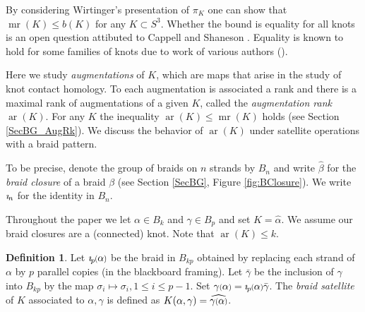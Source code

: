 \documentclass[11pt]{amsart}
\def\s{{\sigma}}
\def\ar{\operatorname{ar}}
\def\mr{\operatorname{mr}}
\newcommand*{\smallp}[1]{\scalebox{.75}{\ensuremath#1}}
\newcommand{\pp}[2][p]{\imath_{\hspace*{-1pt}#1}\hspace*{-.5pt}\smallp(#2\smallp)}
\theoremstyle{definition}
\newtheorem{defn}[thm]{Definition}
\begin{document}
By considering Wirtinger's presentation of $\pi_K$ one can show that $\mr(K)\le b(K)$ for any $K\subset S^3$. Whether the bound is equality for all knots is an open question attibuted to Cappell and Shaneson \cite[Prob. 1.11]{Kir95}. Equality is known to hold for some families of knots due to work of various authors (\cite{BZ,Cor13b,RZ}).

Here we study \emph{augmentations} of $K$, which are maps that arise in the study of knot contact homology. To each augmentation is associated a rank and there is a maximal rank of augmentations of a given $K$, called the \emph{augmentation rank} $\ar(K)$. For any $K$ the inequality $\ar(K)\le \mr(K)$ holds (see Section \ref{SecBG_AugRk}). We discuss the behavior of $\ar(K)$ under satellite operations with a braid pattern. 

To be precise, denote the group of braids on $n$ strands by $B_n$ and write $\hat{\beta}$ for the \emph{braid closure} of a braid $\beta$ (see Section \ref{SecBG}, Figure \ref{fig:BClosure}). We write $\imath_{\hspace*{-1pt}n}$ for the identity in $B_n$. 

Throughout the paper we let $\alpha\in B_k$ and $\gamma\in B_p$ and set $K = \hat{\alpha}$. We assume our braid closures are a (connected) knot. Note that $\ar(K)\le k$.

\begin{defn} Let $\pp\alpha$ be the braid in $B_{kp}$ obtained by replacing each strand of $\alpha$ by $p$ parallel copies (in the blackboard framing). Let $\bar\gamma$ be the inclusion of $\gamma$ into $B_{kp}$ by the map $\s_i\mapsto\s_i, 1\le i\le p-1$. Set $\gamma\smallp(\alpha\smallp) = \pp\alpha\bar\gamma$. The \emph{braid satellite} of $K$ associated to $\alpha, \gamma$ is defined as $K(\alpha,\gamma) = \widehat{\gamma\smallp(\alpha\smallp)}$.
\label{defn:BraidSat}
\end{defn}
\end{document}
